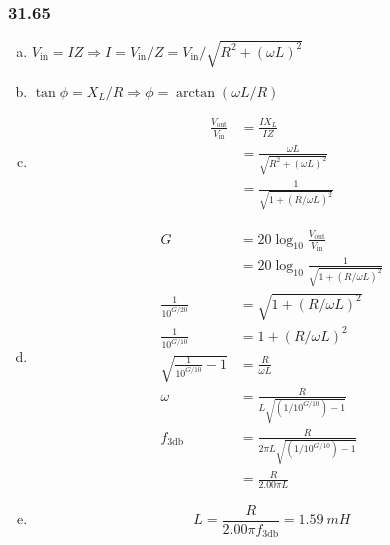 \documentclass{article}
\begin{document}
\subsubsection{31.65}

\begin{enumerate}[(a)]
  \item $V_\text{in} = I Z \Rightarrow I = V_\text{in} / Z = V_\text{in} / \sqrt{R^2 + (\omega L)^2}$

  \item $\tan \phi = X_L / R \Rightarrow \phi = \arctan (\omega L / R)$

  \item

        \begin{align*}
          \frac{V_\text{out}}{V_\text{in}} & = \frac{I X_L}{I Z}                          \\
                                           & = \frac{\omega L}{\sqrt{R^2 + (\omega L)^2}} \\
                                           & = \frac{1}{\sqrt{1 + (R / \omega L)^2}}
        \end{align*}

  \item

        \begin{align*}
          G                                & = 20 \log_{10} \frac{V_\text{out}}{V_\text{in}}      \\
                                           & = 20 \log_{10} \frac{1}{\sqrt{1 + (R / \omega L)^2}} \\
          \frac{1}{10^{G / 20}}            & = \sqrt{1 + (R / \omega L)^2}                        \\
          \frac{1}{10^{G / 10}}            & = 1 + (R / \omega L)^2                               \\
          \sqrt{\frac{1}{10^{G / 10}} - 1} & = \frac{R}{\omega L}                                 \\
          \omega                           & = \frac{R}{L \sqrt{(1 / 10^{G / 10}) - 1}}           \\
          f_{\text{3db}}                   & = \frac{R}{2 \pi L \sqrt{(1 / 10^{G / 10}) - 1}}     \\
                                           & = \frac{R}{2.00 \pi L}
        \end{align*}

  \item \[L = \frac{R}{2.00 \pi f_\text{3db}} = \qty{1.59}{mH}\]
\end{enumerate}
\end{document}
